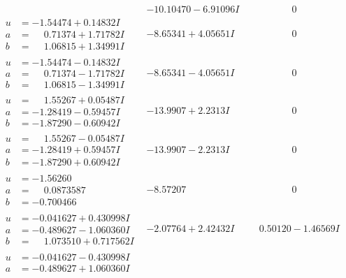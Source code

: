 \documentclass[1p]{elsarticle_modified}
\theoremstyle{definition}
\begin{document}
$$\begin{array}{c|c|c}
 & -10.10470 - 6.91096 I & \phantom{-0.000000 } 0 \\ \hline\begin{aligned}
u &= -1.54474 + 0.14832 I \\
a &= \phantom{-}0.71374 + 1.71782 I \\
b &= \phantom{-}1.06815 + 1.34991 I\end{aligned}
 & -8.65341 + 4.05651 I & \phantom{-0.000000 } 0 \\ \hline\begin{aligned}
u &= -1.54474 - 0.14832 I \\
a &= \phantom{-}0.71374 - 1.71782 I \\
b &= \phantom{-}1.06815 - 1.34991 I\end{aligned}
 & -8.65341 - 4.05651 I & \phantom{-0.000000 } 0 \\ \hline\begin{aligned}
u &= \phantom{-}1.55267 + 0.05487 I \\
a &= -1.28419 - 0.59457 I \\
b &= -1.87290 - 0.60942 I\end{aligned}
 & -13.9907 + 2.2313 I & \phantom{-0.000000 } 0 \\ \hline\begin{aligned}
u &= \phantom{-}1.55267 - 0.05487 I \\
a &= -1.28419 + 0.59457 I \\
b &= -1.87290 + 0.60942 I\end{aligned}
 & -13.9907 - 2.2313 I & \phantom{-0.000000 } 0 \\ \hline\begin{aligned}
u &= -1.56260\phantom{ +0.000000I} \\
a &= \phantom{-}0.0873587\phantom{ +0.000000I} \\
b &= -0.700466\phantom{ +0.000000I}\end{aligned}
 & -8.57207\phantom{ +0.000000I} & \phantom{-0.000000 } 0 \\ \hline\begin{aligned}
u &= -0.041627 + 0.430998 I \\
a &= -0.489627 - 1.060360 I \\
b &= \phantom{-}1.073510 + 0.717562 I\end{aligned}
 & -2.07764 + 2.42432 I & \phantom{-}0.50120 - 1.46569 I \\ \hline\begin{aligned}
u &= -0.041627 - 0.430998 I \\
a &= -0.489627 + 1.060360 I \\

\end{aligned}
\end{array}$$
\end{document}

